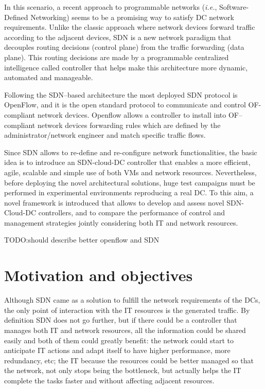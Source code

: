 \documentclass[12pt,english]{book}
\begin{document}
In this scenario, a recent approach to programmable networks (\textit{i.e.}, Software-Defined Networking) seems to be a promising way to satisfy DC network requirements\cite{ibmnec}. 
Unlike the classic approach where network devices forward traffic according to the adjacent devices, SDN is a new network paradigm that decouples routing decisions (control plane) from the traffic forwarding (data plane). This routing decisions are made by a programmable centralized intelligence called controller that helps make this architecture more dynamic, automated and manageable.

Following the SDN--based architecture the most deployed SDN protocol is OpenFlow\cite{openflow}\cite{onf}, and it is the open standard protocol to communicate and control OF-compliant network devices.
Openflow allows a controller to install into OF--compliant network devices forwarding rules which are defined by the administrator/network engineer and match specific traffic flows.

Since SDN allows to re-define and re-configure network functionalities, the basic idea is to introduce an SDN-cloud-DC controller that enables a more efficient, agile, scalable and simple use of both VMs and network resources.
Nevertheless, before deploying the novel architectural solutions, huge test campaigns must be performed in experimental environments reproducing a real DC.
To this aim, a novel framework is introduced that allows to develop and assess novel SDN-Cloud-DC controllers, and to compare the performance of control and management strategies jointly considering both IT and network resources\cite{im2013}.

TODO:should describe better openflow and SDN

\section{Motivation and objectives\label{sec:motobj}}

Although SDN came as a solution to fulfill the network requirements of the DCs, the only point of interaction with the IT resources is the generated traffic.
By definition SDN does not go further, but if there could be a controller that manages both IT and network resources, all the information could be shared easily and both of them could greatly benefit: the network could start to anticipate IT actions and adapt itself to have higher performance, more redundancy, etc; the IT because the resources could be better managed so that the network, not only stops being the bottleneck, but actually helps the IT complete the tasks faster and without affecting adjacent resources.
\end{document}

